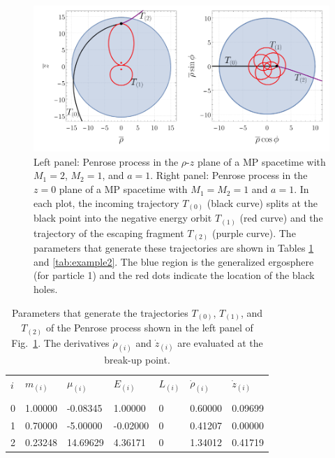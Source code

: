\begin{figure}[!htbp]
    \centering
    \includegraphics[scale=0.70]{img/penrose_binaries/fig6.pdf}
    \caption{Left panel: Penrose process in the $\rho$-$z$ plane of a MP spacetime with $M_1=2$, $M_2=1$, and $a=1$. Right panel: Penrose process in the $z=0$ plane of a MP spacetime with $M_1=M_2=1$ and $a=1$. In each plot, the incoming trajectory $T_{(0)}$ (black curve) splits at the black point into the negative energy orbit $T_{(1)}$ (red curve) and the trajectory of the escaping fragment $T_{(2)}$ (purple curve). The parameters that generate these trajectories are shown in Tables \ref{tab:example1} and \ref{tab:example2}. The blue region is the generalized ergosphere (for particle 1) and the red dots indicate the location of the black holes.}
    \label{fig:example1}
\end{figure}

\renewcommand{\arraystretch}{1.2}
\begin{table}[!htbp]

    \begin{tabular}{lllllll}
        $i$ & $m_{(i)}$ & $\mu_{(i)}$ & $E_{(i)}$ & $L_{(i)}$ & $\dot{\rho}_{(i)}$ & $\dot{z}_{(i)}$ \\ \vspace{-0.3cm} \\
        0   & 1.00000   & -0.08345    & 1.00000   & 0         & 0.60000            & 0.09699         \\
        1   & 0.70000   & -5.00000    & -0.02000  & 0         & 0.41207            & 0.00000         \\
        2   & 0.23248   & 14.69629    & 4.36171   & 0         & 1.34012            & 0.41719         \\
    \end{tabular}

    \caption{Parameters that generate the trajectories $T_{(0)}$, $T_{(1)}$, and $T_{(2)}$ of the Penrose process shown in the left panel of Fig.~\ref{fig:example1}. The derivatives $\dot{\rho}_{(i)}$ and $\dot{z}_{(i)}$ are evaluated at the break-up point.}
    \label{tab:example1}
\end{table}


